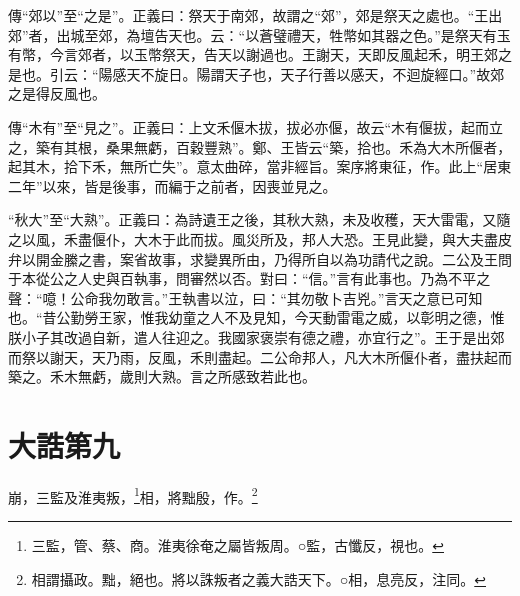 {\noindent\zhuan{}\fzbyks 傳“郊以”至“之是”。正義曰：祭天于南郊，故謂之“郊”，郊是祭天之處也。“王出郊”者，出城至郊，為壇告天也。云：“以蒼璧禮天，牲幣如其器之色。”是祭天有玉有幣，今言郊者，以玉幣祭天，告天以謝過也。王謝天，天即反風起禾，明王郊之是也。引云：“陽感天不旋日。陽謂天子也，天子行善以感天，不迴旋經口。”故郊之是得反風也。 \par}

{\noindent\zhuan{}\fzbyks 傳“木有”至“見之”。正義曰：上文禾偃木拔，拔必亦偃，故云“木有偃拔，起而立之，築有其根，桑果無虧，百穀豐熟”。鄭、王皆云“築，拾也。禾為大木所偃者，起其木，拾下禾，無所亡失”。意太曲碎，當非經旨。案序將東征，作。此上“居東二年”以來，皆是後事，而編于之前者，因喪並見之。 \par}

{\noindent\shu{}\fzkt “秋大”至“大熟”。正義曰：為詩遺王之後，其秋大熟，未及收穫，天大雷電，又隨之以風，禾盡偃仆，大木于此而拔。風災所及，邦人大恐。王見此變，與大夫盡皮弁以開金縢之書，案省故事，求變異所由，乃得所自以為功請代之說。二公及王問于本從公之人史與百執事，問審然以否。對曰：“信。”言有此事也。乃為不平之聲：“噫！公命我勿敢言。”王執書以泣，曰：“其勿敬卜吉兇。”言天之意已可知也。“昔公勤勞王家，惟我幼童之人不及見知，今天動雷電之威，以彰明之德，惟朕小子其改過自新，遣人往迎之。我國家褒崇有德之禮，亦宜行之”。王于是出郊而祭以謝天，天乃雨，反風，禾則盡起。二公命邦人，凡大木所偃仆者，盡扶起而築之。禾木無虧，歲則大熟。言之所感致若此也。 \par}

\section{大誥第九}


崩，三監及淮夷叛，\footnote{三監，管、蔡、商。淮夷徐奄之屬皆叛周。○監，古懺反，視也。}相，將黜殷，作。\footnote{相謂攝政。黜，絕也。將以誅叛者之義大誥天下。○相，息亮反，注同。}

